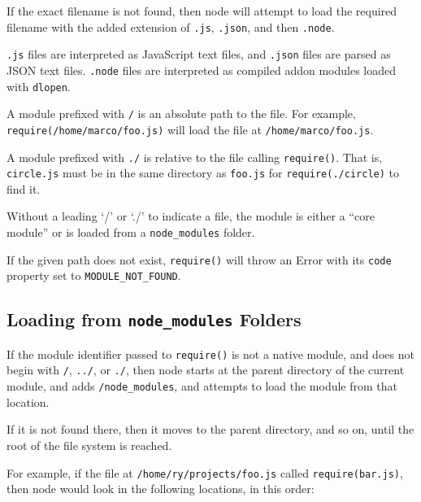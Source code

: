 If the exact filename is not found, then node will attempt to load the
required filename with the added extension of \texttt{.js},
\texttt{.json}, and then \texttt{.node}.

\texttt{.js} files are interpreted as JavaScript text files, and
\texttt{.json} files are parsed as JSON text files. \texttt{.node} files
are interpreted as compiled addon modules loaded with \texttt{dlopen}.

A module prefixed with \texttt{\textquotesingle{}/\textquotesingle{}} is
an absolute path to the file. For example,
\texttt{require(\textquotesingle{}/home/marco/foo.js\textquotesingle{})}
will load the file at \texttt{/home/marco/foo.js}.

A module prefixed with \texttt{\textquotesingle{}./\textquotesingle{}}
is relative to the file calling \texttt{require()}. That is,
\texttt{circle.js} must be in the same directory as \texttt{foo.js} for
\texttt{require(\textquotesingle{}./circle\textquotesingle{})} to find
it.

Without a leading `/' or `./' to indicate a file, the module is either a
``core module'' or is loaded from a \texttt{node\_modules} folder.

If the given path does not exist, \texttt{require()} will throw an Error
with its \texttt{code} property set to
\texttt{\textquotesingle{}MODULE\_NOT\_FOUND\textquotesingle{}}.

\subsection{\texorpdfstring{Loading from \texttt{node\_modules}
Folders}{Loading from node\_modules Folders}}\label{loading-from-nodeux5fmodules-folders}

If the module identifier passed to \texttt{require()} is not a native
module, and does not begin with
\texttt{\textquotesingle{}/\textquotesingle{}},
\texttt{\textquotesingle{}../\textquotesingle{}}, or
\texttt{\textquotesingle{}./\textquotesingle{}}, then node starts at the
parent directory of the current module, and adds
\texttt{/node\_modules}, and attempts to load the module from that
location.

If it is not found there, then it moves to the parent directory, and so
on, until the root of the file system is reached.

For example, if the file at
\texttt{\textquotesingle{}/home/ry/projects/foo.js\textquotesingle{}}
called \texttt{require(\textquotesingle{}bar.js\textquotesingle{})},
then node would look in the following locations, in this order:

